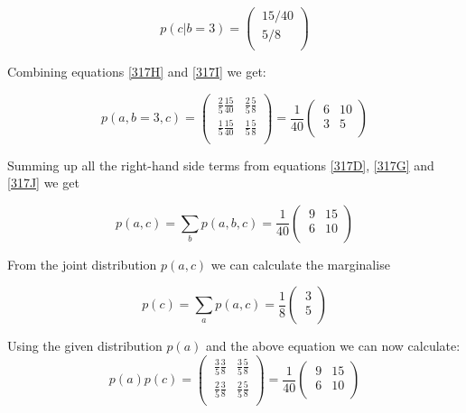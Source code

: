 \documentclass[11pt,a4paper,oneside]{report}
\begin{document}
\begin{equation}
\label{317I}
p(c | b = 3) =  
  \begin{pmatrix}
   \ 15/40 \\[0.4em]
   \ 5/8 \\
 \end{pmatrix} 
\end{equation}

Combining equations \eqref{317H} and \eqref{317I} we get:

\begin{equation}
\label{317J}
p(a, b = 3, c) =  
  \begin{pmatrix}
   \ \frac{2}{5} \frac{15}{40} & \frac{2}{5} \frac{5}{8} \\[0.4em]
   \ \frac{1}{5} \frac{15}{40} & \frac{1}{5} \frac{5}{8} \\
 \end{pmatrix} = \frac{1}{40}
  \begin{pmatrix}
   \ 6 & 10 \\[0.4em]
   \ 3 & 5 \\
 \end{pmatrix} 
\end{equation}

Summing up all the right-hand side terms from equations \eqref{317D},  
\eqref{317G} and  \eqref{317J} we get

\begin{equation}
\label{317K}
p(a, c) =  \sum_{b} p(a,b,c) = \frac{1}{40}
  \begin{pmatrix}
   \ 9 & 15 \\[0.4em]
   \ 6 & 10 \\
 \end{pmatrix} 
\end{equation}
 
From the joint distribution $p(a,c)$ we can calculate the marginalise

\begin{equation}
\label{317L}
p(c) =  \sum_{a} p(a,c) = \frac{1}{8}
  \begin{pmatrix}
   \ 3 \\[0.4em]
   \ 5 \\
 \end{pmatrix} 
\end{equation}
 
Using the given distribution $p(a)$ and the above equation we can now calculate:
\begin{equation}
\label{317M}
p(a)p(c) =
  \begin{pmatrix}
   \ \frac{3}{5} \frac{3}{8} & \frac{3}{5} \frac{5}{8} \\[0.4em]
   \ \frac{2}{5} \frac{3}{8} & \frac{2}{5} \frac{5}{8} \\
 \end{pmatrix} = \frac{1}{40}
  \begin{pmatrix}
   \ 9 & 15 \\[0.4em]
   \ 6 & 10 \\
 \end{pmatrix} 
\end{equation}
\end{document}
